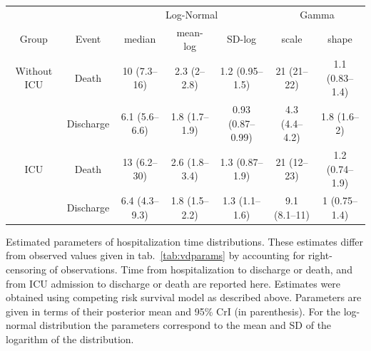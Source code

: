 \begin{fwtable}
    \centering
    \begin{tabular}{ccccccc}
\toprule
 & & \multicolumn{3}{c}{Log-Normal} & \multicolumn{2}{c}{Gamma}\\ \cmidrule(rl){3-5} \cmidrule(rl){6-7}
Group & Event & median & mean-log & SD-log & scale & shape\\
\midrule
Without ICU & Death & 10 (7.3--16) & 2.3 (2--2.8) & 1.2 (0.95--1.5) & 21 (21--22) & 1.1 (0.83--1.4)\\
 & Discharge & 6.1 (5.6--6.6) & 1.8 (1.7--1.9) & 0.93 (0.87--0.99) & 4.3 (4.4--4.2) & 1.8 (1.6--2)\\ \addlinespace
ICU & Death & 13 (6.2--30) & 2.6 (1.8--3.4) & 1.3 (0.87--1.9) & 21 (12--23) & 1.2 (0.74--1.9)\\
 & Discharge & 6.4 (4.3--9.3) & 1.8 (1.5--2.2) & 1.3 (1.1--1.6) & 9.1 (8.1--11) & 1 (0.75--1.4)\\
\bottomrule
\end{tabular}
\caption[Estimated parameters of hospitalization time distributions]{Estimated parameters of hospitalization time distributions. These estimates differ from observed values given in tab.~\ref{tab:vdparams} by accounting for right-censoring of observations. Time from hospitalization to discharge or death, and from ICU admission to discharge or death are reported here. Estimates were obtained using competing risk survival model as described above. Parameters are given in terms of their posterior mean and 95\% CrI (in parenthesis). For the log-normal distribution the parameters correspond to the mean and SD of the logarithm of the distribution.}
     \label{tab:survpars}
\end{fwtable}




